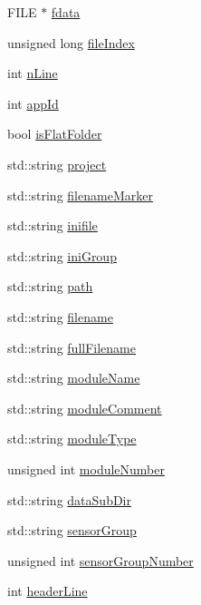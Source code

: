 \begin{DoxyCompactItemize}
\item 
F\-I\-L\-E $\ast$ \hyperlink{classDAQDevice_a0dcbda57c0b7b95d27a53ed5e1fabf59}{fdata}
\item 
unsigned long \hyperlink{classDAQDevice_a68a1e79d4d2efd8592d566bacc1838f2}{file\-Index}
\item 
int \hyperlink{classDAQDevice_a96c5b196a01603f4b8e37c3840597295}{n\-Line}
\item 
int \hyperlink{classDAQDevice_a2f0b3d2e531be7f5d06f47a4753d35bd}{app\-Id}
\item 
bool \hyperlink{classDAQDevice_a4431ebea220a683acb12ce0f78e87927}{is\-Flat\-Folder}
\item 
std\-::string \hyperlink{classDAQDevice_a2febc34bb56a8b39d0d13523ccc60c3e}{project}
\item 
std\-::string \hyperlink{classDAQDevice_a43ebbf069d065fdafba9aa9664ab76b1}{filename\-Marker}
\item 
std\-::string \hyperlink{classDAQDevice_aeacc409b639f3ed09cfdbd9b2c3e7d09}{inifile}
\item 
std\-::string \hyperlink{classDAQDevice_a10e5184e28ccafa407167c032f8496ea}{ini\-Group}
\item 
std\-::string \hyperlink{classDAQDevice_a388a037825fdd2248eb1cadf15780bcd}{path}
\item 
std\-::string \hyperlink{classDAQDevice_a7f9cda7cf5b41f6b134c313477e9644b}{filename}
\item 
std\-::string \hyperlink{classDAQDevice_a1bb9bdd8a55337b40e44d159cb1cc8e5}{full\-Filename}
\item 
std\-::string \hyperlink{classDAQDevice_a5fb94d0eed52bfb5df51424a21f3482f}{module\-Name}
\item 
std\-::string \hyperlink{classDAQDevice_a962a90d4dd66bb3d4c3cab6ec628db73}{module\-Comment}
\item 
std\-::string \hyperlink{classDAQDevice_ab246fcff5cbe2a1f4748db00bb9fa5c4}{module\-Type}
\item 
unsigned int \hyperlink{classDAQDevice_a07fc449a690016ffa1b1bc029b956c02}{module\-Number}
\item 
std\-::string \hyperlink{classDAQDevice_a8adec9c21ffa22beee97e2eda1f2488c}{data\-Sub\-Dir}
\item 
std\-::string \hyperlink{classDAQDevice_a63a6793abe5933e7dc71cd673bd0f98f}{sensor\-Group}
\item 
unsigned int \hyperlink{classDAQDevice_aa35abc3d365a36659b64df6cadf2c807}{sensor\-Group\-Number}
\item 
int \hyperlink{classDAQDevice_a06e7f707d2d97b192a4389a0c4fd231d}{header\-Line}

\end{DoxyCompactItemize}
